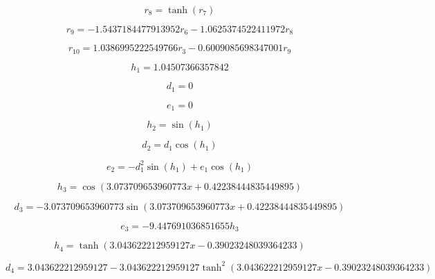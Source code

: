 \begin{equation}
r_{8}=\tanh{\left(r_{7} \right)}
\end{equation}


\begin{equation}
r_{9}=- 1.5437184477913952 r_{6} - 1.0625374522411972 r_{8}
\end{equation}


\begin{equation}
r_{10}=1.0386995222549766 r_{3} - 0.6009085698347001 r_{9}
\end{equation}


\begin{equation}
h_{1}=1.04507366357842
\end{equation}


\begin{equation}
d_{1}=0
\end{equation}


\begin{equation}
e_{1}=0
\end{equation}


\begin{equation}
h_{2}=\sin{\left(h_{1} \right)}
\end{equation}


\begin{equation}
d_{2}=d_{1} \cos{\left(h_{1} \right)}
\end{equation}


\begin{equation}
e_{2}=- d_{1}^{2} \sin{\left(h_{1} \right)} + e_{1} \cos{\left(h_{1} \right)}
\end{equation}


\begin{equation}
h_{3}=\cos{\left(3.073709653960773 x + 0.42238444835449895 \right)}
\end{equation}


\begin{equation}
d_{3}=- 3.073709653960773 \sin{\left(3.073709653960773 x + 0.42238444835449895 \right)}
\end{equation}


\begin{equation}
e_{3}=- 9.447691036851655 h_{3}
\end{equation}


\begin{equation}
h_{4}=\tanh{\left(3.043622212959127 x - 0.39023248039364233 \right)}
\end{equation}


\begin{equation}
d_{4}=3.043622212959127 - 3.043622212959127 \tanh^{2}{\left(3.043622212959127 x - 0.39023248039364233 \right)}
\end{equation}


